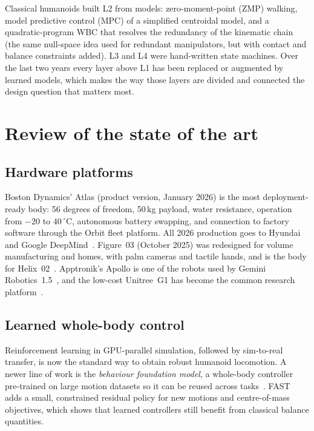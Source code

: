 \documentclass[11pt,a4paper]{article}
\begin{document}
\noindent
Classical humanoids built L2 from models: zero-moment-point (ZMP) walking,
model predictive control (MPC) of a simplified centroidal model, and a
quadratic-program WBC that resolves the redundancy of the kinematic chain
(the same null-space idea used for redundant manipulators, but with contact
and balance constraints added).  L3 and L4 were hand-written state machines.
Over the last two years every layer above L1 has been replaced or augmented by
learned models, which makes the way those layers are divided and connected the
design question that matters most.

\section{Review of the state of the art}

\subsection{Hardware platforms}

Boston Dynamics' Atlas (product version, January 2026) is the most
deployment-ready body: 56 degrees of freedom, 50\,kg payload, water
resistance, operation from $-20$ to $40\,^\circ$C, autonomous battery swapping,
and connection to factory software through the Orbit fleet platform.  All
2026 production goes to Hyundai and Google DeepMind~\cite{bd-atlas-2026}.
Figure~03 (October 2025) was redesigned for volume manufacturing and homes,
with palm cameras and tactile hands, and is the body for
Helix~02~\cite{figure-03}.  Apptronik's Apollo is one of the robots used by
Gemini Robotics~1.5~\cite{gemini-15}, and the low-cost Unitree~G1 has become
the common research platform~\cite{huge-2026,motionvla-2026}.

\subsection{Learned whole-body control}

Reinforcement learning in GPU-parallel simulation, followed by sim-to-real
transfer, is now the standard way to obtain robust humanoid locomotion.  A
newer line of work is the \emph{behaviour foundation model}, a whole-body
controller pre-trained on large motion datasets so it can be reused across
tasks~\cite{bfm-survey}.  FAST~\cite{fast-2026} adds a small, constrained
residual policy for new motions and centre-of-mass objectives, which shows
that learned controllers still benefit from classical balance quantities.
\end{document}
